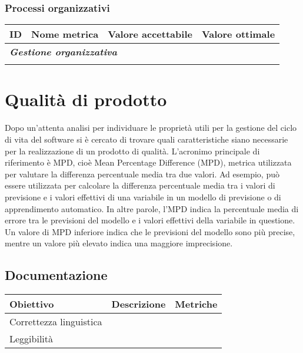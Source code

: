 \documentclass[10pt, a4paper]{article}
\begin{document}
\subsubsection{Processi organizzativi}
    {\renewcommand{\arraystretch}{1.5}
    \begin{tabularx}{\textwidth}{p{}|p{}|X|X}
    \textbf{ID} & \textbf{Nome metrica} & \textbf{Valore accettabile} & \textbf{Valore ottimale}  \\
    \hline
    \multicolumn{4}{l}{\cellcolor{primarycolor}\textbf{\textit{Gestione organizzativa}}} \\
    \hline
     &  &  &  \\
    \end{tabularx}}  

\newpage
\section{Qualità di prodotto}
Dopo un'attenta analisi per individuare le proprietà utili per la gestione del ciclo di vita del software 
si è cercato di trovare quali caratteristiche siano necessarie per la realizzazione di un prodotto di 
qualità.
L'acronimo principale di riferimento è MPD, cioè Mean Percentage Difference (MPD), metrica 
utilizzata per valutare la differenza percentuale media tra due valori. Ad esempio, può essere 
utilizzata per calcolare la differenza percentuale media tra i valori di previsione e i valori effettivi di 
una variabile in un modello di previsione o di apprendimento automatico.
In altre parole, l'MPD indica la percentuale media di errore tra le previsioni del modello e i valori 
effettivi della variabile in questione. Un valore di MPD inferiore indica che le previsioni del modello 
sono più precise, mentre un valore più elevato indica una maggiore imprecisione.
\subsection{Documentazione}
    {\renewcommand{\arraystretch}{1.5}
    \begin{tabularx}{\textwidth}{p{}|p{}|X}
    \textbf{Obiettivo} & \textbf{Descrizione} & \textbf{Metriche}  \\
    \hline
    Correttezza linguistica &  & \\
    \hline
    Leggibilità &  &  \\
    \end{tabularx}}
    
\end{document}
